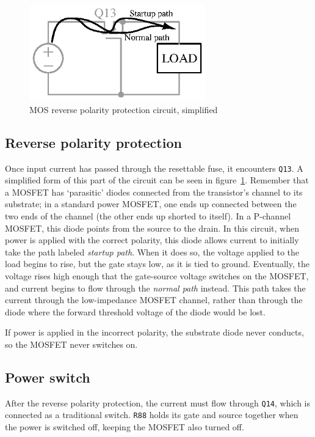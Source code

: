 \documentclass[article,oneside]{memoir}
\newcommand{\refdes}[1]{\texttt{#1}}
\begin{document}
\begin{multicols}{2}
\begin{figure}[H]
\centering
\includegraphics[width=3in]{mosrpp}
\caption{MOS reverse polarity protection circuit, simplified}
\label{fig:mosrpp}
\end{figure}

\subsection{Reverse polarity protection}

Once input current has passed through the resettable fuse, it encounters
\refdes{Q13}. A simplified form of this part of the circuit can be seen in
figure~\ref{fig:mosrpp}. Remember that a MOSFET has `parasitic' diodes
connected from the transistor's channel to its substrate; in a
standard power MOSFET, one ends up connected between the two ends of the
channel (the other ends up shorted to itself). In a P-channel MOSFET, this
diode points from the source to the drain. In this circuit, when power is
applied with the correct polarity, this diode allows current to initially take
the path labeled \emph{startup path}. When it does so, the voltage applied to
the load begins to rise, but the gate stays low, as it is tied to ground.
Eventually, the voltage rises high enough that the gate-source voltage switches
on the MOSFET, and current begins to flow through the \emph{normal path}
instead. This path takes the current through the low-impedance MOSFET channel,
rather than through the diode where the forward threshold voltage of the diode
would be lost.

If power is applied in the incorrect polarity, the substrate diode never
conducts, so the MOSFET never switches on.

\subsection{Power switch}

After the reverse polarity protection, the current must flow through
\refdes{Q14}, which is connected as a traditional switch. \refdes{R88} holds
its gate and source together when the power is switched off, keeping the MOSFET
also turned off.


\end{multicols}
\end{document}
